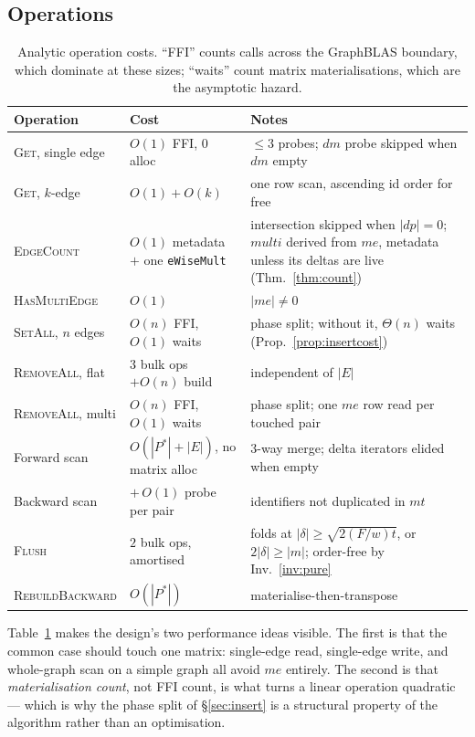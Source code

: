 \documentclass[11pt,a4paper]{article}
\theoremstyle{plain}
\theoremstyle{definition}
\theoremstyle{remark}
\begin{document}
\subsection{Operations}

\begin{table}[!ht]
\centering
\small
\begin{tabular}{@{}llp{6.7cm}@{}}
\toprule
Operation & Cost & Notes \\
\midrule
\textsc{Get}, single edge & $O(1)$ FFI, $0$ alloc & $\le 3$ probes; $dm$ probe skipped when $dm$ empty \\
\textsc{Get}, $k$-edge    & $O(1) + O(k)$ & one row scan, ascending id order for free \\
\textsc{EdgeCount}        & $O(1)$ metadata $+$ one \texttt{eWiseMult} & intersection skipped when $|dp| = 0$; $\textit{multi}$ derived from $me$, metadata unless its deltas are live (Thm.~\ref{thm:count}) \\
\textsc{HasMultiEdge}     & $O(1)$ & $|me| \neq 0$ \\
\textsc{SetAll}, $n$ edges & $O(n)$ FFI, $O(1)$ waits & phase split; without it, $\Theta(n)$ waits (Prop.~\ref{prop:insertcost}) \\
\textsc{RemoveAll}, flat  & $3$ bulk ops $+ O(n)$ build & independent of $|E|$ \\
\textsc{RemoveAll}, multi & $O(n)$ FFI, $O(1)$ waits & phase split; one $me$ row read per touched pair \\
Forward scan              & $O(|P^{\ast}| + |E|)$, no matrix alloc & 3-way merge; delta iterators elided when empty \\
Backward scan             & $+\,O(1)$ probe per pair & identifiers not duplicated in $mt$ \\
\textsc{Flush}            & $2$ bulk ops, amortised & folds at $|\delta| \ge \sqrt{2(F/w)t}$, or $2|\delta| \ge |m|$; order-free by Inv.~\ref{inv:pure} \\
\textsc{RebuildBackward}  & $O(|P^{\ast}|)$ & materialise-then-transpose \\
\bottomrule
\end{tabular}
\caption{Analytic operation costs. ``FFI'' counts calls across the GraphBLAS
boundary, which dominate at these sizes; ``waits'' count matrix
materialisations, which are the asymptotic hazard.}
\label{tab:ops}
\end{table}

Table~\ref{tab:ops} makes the design's two performance ideas visible. The
first is that the common case should touch one matrix: single-edge read,
single-edge write, and whole-graph scan on a simple graph all avoid $me$
entirely. The second is that \emph{materialisation count}, not FFI count, is
what turns a linear operation quadratic --- which is why the phase split of
\S\ref{sec:insert} is a structural property of the algorithm rather than an
optimisation.
\end{document}
